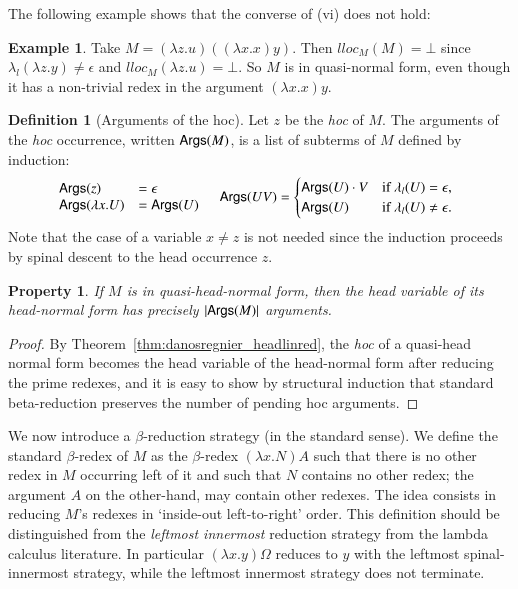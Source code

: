 \documentclass{elsarticle}
\theoremstyle{plain}
\newtheorem{property}[theorem]{Property}
\theoremstyle{definition}
\newtheorem{definition}{Definition}[section]
\newtheorem{example}{Example}[section]
\begin{document}
The following example shows that the converse of (vi) does not hold:
\begin{example}
Take $M= (\lambda z.u)((\lambda x . x) y)$. Then $lloc_M(M) = \bot$ since $\lambda_l(\lambda z.y)\ne\epsilon$ and $lloc_M(\lambda z.u) = \bot$.
So $M$ is in quasi-normal form, even though it has a non-trivial redex in the argument $(\lambda x . x) y$.
\end{example}

\begin{definition}[Arguments of the hoc]
Let $z$ be the \emph{hoc} of $M$. The arguments of the \emph{hoc} occurrence, written ${\sf Args}(M)$, is a list of subterms of $M$ defined by induction:
\begin{align*}
    & \begin{array}{ll}
        {\sf Args}(z) &= \epsilon \\
        {\sf Args}(\lambda x . U ) &= {\sf Args}(U)
    \end{array}
&
{\sf Args}(U V) &=
    \begin{cases}
        {\sf Args}(U) \cdot V & \mbox{if } \lambda_l(U) = \epsilon, \\
        {\sf Args}(U)         & \mbox{if } \lambda_l(U) \neq \epsilon.
    \end{cases}
\end{align*}
Note that the case of a variable $x\neq z$ is not needed since the induction proceeds by spinal descent to the head occurrence $z$.
\end{definition}

\begin{property}
\label{property:hoc_argument_count_in_headnf}
    If $M$ is in quasi-head-normal form, then the head variable of its head-normal form has precisely $|{\sf Args}(M)|$ arguments.
\end{property}
\begin{proof}
By Theorem~\ref{thm:danosregnier_headlinred}, the \emph{hoc} of a quasi-head normal form becomes the head variable of the head-normal form after reducing the prime redexes, and it is easy to show by structural induction that standard beta-reduction preserves the number of pending hoc arguments.
\end{proof}

We now introduce a $\beta$-reduction strategy (in the standard sense).
We define the  standard $\beta$-redex of $M$ as the $\beta$-redex $(\lambda x . N) A$ such that there is no other redex in $M$ occurring left of it and such that $N$ contains no other redex; the argument $A$ on the other-hand, may contain other redexes.
The idea consists in reducing $M$'s redexes in `inside-out left-to-right' order.
This definition should be distinguished from the \emph{leftmost innermost} reduction strategy from the lambda calculus literature.
In particular $(\lambda x . y) \Omega$ reduces to $y$ with the leftmost spinal-innermost strategy, while the leftmost innermost strategy does not terminate.
\end{document}
